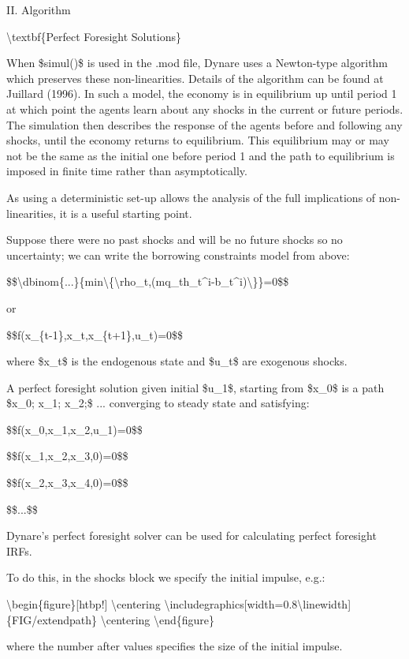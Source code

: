 \documentclass[10pt,math=newtx,citestyle=gb7714-2015,bibstyle=gb7714-2015]{elegantbook}
\begin{document}
	II. Algorithm
	
	\textbackslash{}textbf\{Perfect Foresight Solutions\}
	
	When \$simul()\$ is used in the .mod file, Dynare uses a Newton-type algorithm which preserves these non-linearities. Details of the algorithm can be found at Juillard (1996). In such a model, the economy is in equilibrium up until period 1 at which point the agents learn about any shocks in the current or
	future periods. The simulation then describes the response of the agents before and following any shocks, until the economy returns to equilibrium. This equilibrium may or may not be the same as the initial one before period 1 and the path to equilibrium is imposed in finite time rather than asymptotically.
	
	As using a deterministic set-up allows the analysis of the full implications of non-linearities, it is a useful starting point.
	
	Suppose there were no past shocks and will be no future shocks so no uncertainty; we can write the borrowing constraints model from above:
	
	\$\$\textbackslash{}dbinom\{...\}\{min\textbackslash{}\{\textbackslash{}rho\_t,(mq\_th\_t\^{}i-b\_t\^{}i)\textbackslash{}\}\}=0\$\$
	
	or
	
	\$\$f(x\_\{t-1\},x\_t,x\_\{t+1\},u\_t)=0\$\$
	
	where \$x\_t\$ is the endogenous state and \$u\_t\$ are exogenous shocks.
	
	A perfect foresight solution given initial \$u\_1\$, starting from \$x\_0\$ is a path \$x\_0; x\_1; x\_2;\$ ... converging to steady state and satisfying:
	
	\$\$f(x\_0,x\_1,x\_2,u\_1)=0\$\$
	
	\$\$f(x\_1,x\_2,x\_3,0)=0\$\$
	
	\$\$f(x\_2,x\_3,x\_4,0)=0\$\$
	
	\$\$...\$\$
	
	Dynare's perfect foresight solver can be used for calculating perfect foresight IRFs.
	
	To do this, in the shocks block we specify the initial impulse, e.g.:
	
	\textbackslash{}begin\{figure\}[htbp!]
	\textbackslash{}centering
	\textbackslash{}includegraphics[width=0.8\textbackslash{}linewidth]\{FIG/extendpath\}
	\textbackslash{}centering
	\textbackslash{}end\{figure\}
	
	where the number after values specifies the size of the initial impulse.
	
\end{document}
